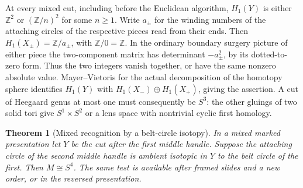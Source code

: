 \documentclass[11pt,letterpaper]{article}
\numberwithin{equation}{section}
\newtheorem{theorem}{Theorem}[section]
\begin{document}
At every mixed cut, including before the Euclidean algorithm,
\(H_1(Y)\) is either \(\mathbb Z^2\) or \((\mathbb Z/n)^2\)
for some \(n\ge1\). Write \(a_\pm\) for the winding numbers of
the attaching circles of the respective pieces read from their
ends. Then \(H_1(X_\pm)=\mathbb Z/a_\pm\), with
\(\mathbb Z/0=\mathbb Z\). In the ordinary boundary surgery
picture of either piece the two-component matrix has determinant
\(-a_\pm^2\), by its dotted-to-zero form. Thus the two integers
vanish together, or have the same nonzero absolute value.
Mayer--Vietoris for the actual decomposition of the homotopy
sphere identifies \(H_1(Y)\) with \(H_1(X_-)\oplus H_1(X_+)\),
giving the assertion. A cut of Heegaard genus at most one must
consequently be \(S^3\): the other gluings of two solid tori give
\(S^1\times S^2\) or a lens space with nontrivial cyclic first homology.

\begin{theorem}[Mixed recognition by a belt-circle isotopy]\label{thm:mixed-meridian}
In a mixed marked presentation let \(Y\) be the cut after the
first middle handle. Suppose the attaching circle of the second
middle handle is ambient isotopic in \(Y\) to the belt circle of
the first. Then \(M\cong S^4\). The same test is available after
framed slides and a new order, or in the reversed presentation.
\end{theorem}
\end{document}
